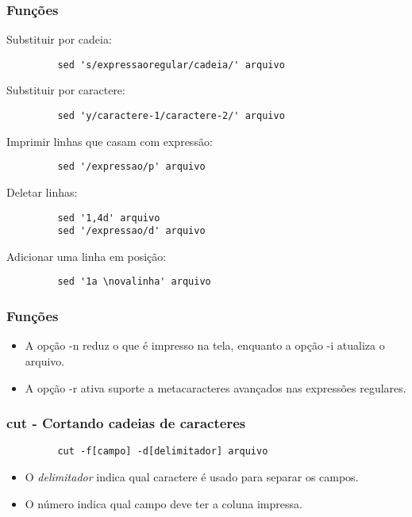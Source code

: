 \documentclass{beamer}
\begin{document}
\begin{frame}[fragile]
   \frametitle{Funções}
   \scriptsize
   \begin{block}{Substituir por cadeia:}
      \begin{verbatim}
         sed 's/expressaoregular/cadeia/' arquivo
      \end{verbatim}   
   \end{block}
   
   \begin{block}{Substituir por caractere:}
      \begin{verbatim}
         sed 'y/caractere-1/caractere-2/' arquivo 
      \end{verbatim}   
   \end{block}

   \begin{block}{Imprimir linhas que casam com expressão:}
      \begin{verbatim}
         sed '/expressao/p' arquivo 
      \end{verbatim}   
   \end{block}

   \begin{block}{Deletar linhas:}
      \begin{verbatim}
         sed '1,4d' arquivo 
         sed '/expressao/d' arquivo 
      \end{verbatim}   
   \end{block}

   \begin{block}{Adicionar uma linha em posição:}
      \begin{verbatim}
         sed '1a \novalinha' arquivo 
      \end{verbatim}   
   \end{block}
\end{frame}

\begin{frame}[fragile]
   \frametitle{Funções}
   \begin{itemize}
      \item A opção -n reduz o que é impresso na tela, enquanto a opção -i atualiza o arquivo. 
      \item A opção -r ativa suporte a metacaracteres avançados nas expressões regulares.
   \end{itemize}
\end{frame}

\begin{frame}[fragile]
   \frametitle{cut - Cortando cadeias de caracteres}
   \begin{center}
      \begin{verbatim}
         cut -f[campo] -d[delimitador] arquivo 
      \end{verbatim}
   \end{center}
   \begin{itemize}
      \item O \textit{delimitador} indica qual caractere é usado para separar os campos.
      \item O número  indica qual campo deve ter a coluna impressa.
   \end{itemize}
\end{frame}
\end{document}
